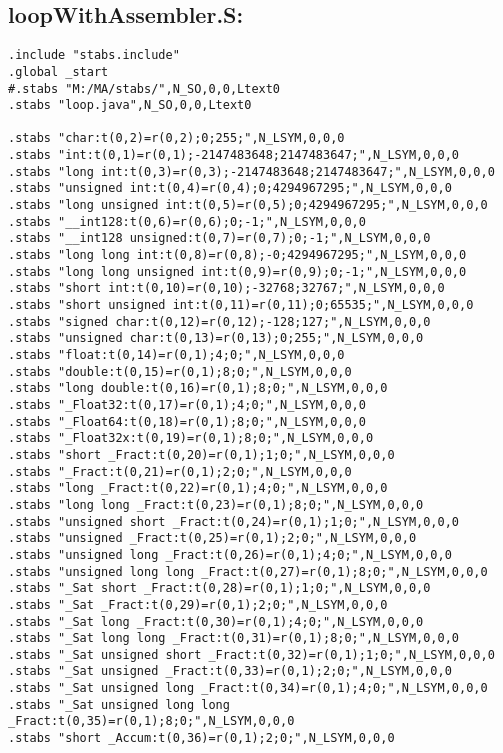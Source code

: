 \subsection{loopWithAssembler.S:}
\label{anhang:loopWithAssembler.S}
\begin{lstlisting}
.include "stabs.include"
.global _start
#.stabs "M:/MA/stabs/",N_SO,0,0,Ltext0
.stabs "loop.java",N_SO,0,0,Ltext0

.stabs "char:t(0,2)=r(0,2);0;255;",N_LSYM,0,0,0
.stabs "int:t(0,1)=r(0,1);-2147483648;2147483647;",N_LSYM,0,0,0
.stabs "long int:t(0,3)=r(0,3);-2147483648;2147483647;",N_LSYM,0,0,0
.stabs "unsigned int:t(0,4)=r(0,4);0;4294967295;",N_LSYM,0,0,0
.stabs "long unsigned int:t(0,5)=r(0,5);0;4294967295;",N_LSYM,0,0,0
.stabs "__int128:t(0,6)=r(0,6);0;-1;",N_LSYM,0,0,0
.stabs "__int128 unsigned:t(0,7)=r(0,7);0;-1;",N_LSYM,0,0,0
.stabs "long long int:t(0,8)=r(0,8);-0;4294967295;",N_LSYM,0,0,0
.stabs "long long unsigned int:t(0,9)=r(0,9);0;-1;",N_LSYM,0,0,0
.stabs "short int:t(0,10)=r(0,10);-32768;32767;",N_LSYM,0,0,0
.stabs "short unsigned int:t(0,11)=r(0,11);0;65535;",N_LSYM,0,0,0
.stabs "signed char:t(0,12)=r(0,12);-128;127;",N_LSYM,0,0,0
.stabs "unsigned char:t(0,13)=r(0,13);0;255;",N_LSYM,0,0,0
.stabs "float:t(0,14)=r(0,1);4;0;",N_LSYM,0,0,0
.stabs "double:t(0,15)=r(0,1);8;0;",N_LSYM,0,0,0
.stabs "long double:t(0,16)=r(0,1);8;0;",N_LSYM,0,0,0
.stabs "_Float32:t(0,17)=r(0,1);4;0;",N_LSYM,0,0,0
.stabs "_Float64:t(0,18)=r(0,1);8;0;",N_LSYM,0,0,0
.stabs "_Float32x:t(0,19)=r(0,1);8;0;",N_LSYM,0,0,0
.stabs "short _Fract:t(0,20)=r(0,1);1;0;",N_LSYM,0,0,0
.stabs "_Fract:t(0,21)=r(0,1);2;0;",N_LSYM,0,0,0
.stabs "long _Fract:t(0,22)=r(0,1);4;0;",N_LSYM,0,0,0
.stabs "long long _Fract:t(0,23)=r(0,1);8;0;",N_LSYM,0,0,0
.stabs "unsigned short _Fract:t(0,24)=r(0,1);1;0;",N_LSYM,0,0,0
.stabs "unsigned _Fract:t(0,25)=r(0,1);2;0;",N_LSYM,0,0,0
.stabs "unsigned long _Fract:t(0,26)=r(0,1);4;0;",N_LSYM,0,0,0
.stabs "unsigned long long _Fract:t(0,27)=r(0,1);8;0;",N_LSYM,0,0,0
.stabs "_Sat short _Fract:t(0,28)=r(0,1);1;0;",N_LSYM,0,0,0
.stabs "_Sat _Fract:t(0,29)=r(0,1);2;0;",N_LSYM,0,0,0
.stabs "_Sat long _Fract:t(0,30)=r(0,1);4;0;",N_LSYM,0,0,0
.stabs "_Sat long long _Fract:t(0,31)=r(0,1);8;0;",N_LSYM,0,0,0
.stabs "_Sat unsigned short _Fract:t(0,32)=r(0,1);1;0;",N_LSYM,0,0,0
.stabs "_Sat unsigned _Fract:t(0,33)=r(0,1);2;0;",N_LSYM,0,0,0
.stabs "_Sat unsigned long _Fract:t(0,34)=r(0,1);4;0;",N_LSYM,0,0,0
.stabs "_Sat unsigned long long _Fract:t(0,35)=r(0,1);8;0;",N_LSYM,0,0,0
.stabs "short _Accum:t(0,36)=r(0,1);2;0;",N_LSYM,0,0,0

\end{lstlisting}
